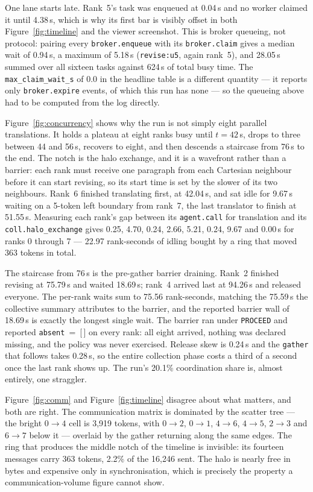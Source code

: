 \documentclass[11pt]{article}
\begin{document}
One lane starts late. Rank~5's task was enqueued at 0.04\,s and no worker claimed it until
4.38\,s, which is why its first bar is visibly offset in both Figure~\ref{fig:timeline} and the
viewer screenshot. This is broker queueing, not protocol: pairing every \texttt{broker.enqueue}
with its \texttt{broker.claim} gives a median wait of 0.94\,s, a maximum of 5.18\,s
(\texttt{revise:u5}, again rank~5), and 28.05\,s summed over all sixteen tasks against 624\,s of
total busy time. The \texttt{max\_claim\_wait\_s} of 0.0 in the headline table is a different
quantity --- it reports only \texttt{broker.expire} events, of which this run has none --- so the
queueing above had to be computed from the log directly.

Figure~\ref{fig:concurrency} shows why the run is not simply eight parallel translations. It holds
a plateau at eight ranks busy until $t = 42$\,s, drops to three between 44 and 56\,s, recovers to
eight, and then descends a staircase from 76\,s to the end. The notch is the halo exchange, and it
is a wavefront rather than a barrier: each rank must receive one paragraph from each Cartesian
neighbour before it can start revising, so its start time is set by the slower of its two
neighbours. Rank~6 finished translating first, at 42.04\,s, and sat idle for 9.67\,s waiting on a
5-token left boundary from rank~7, the last translator to finish at 51.55\,s. Measuring each
rank's gap between its \texttt{agent.call} for translation and its \texttt{coll.halo\_exchange}
gives 0.25, 4.70, 0.24, 2.66, 5.21, 0.24, 9.67 and 0.00\,s for ranks 0 through 7 --- 22.97
rank-seconds of idling bought by a ring that moved 363 tokens in total.

The staircase from 76\,s is the pre-gather barrier draining. Rank~2 finished revising at 75.79\,s
and waited 18.69\,s; rank~4 arrived last at 94.26\,s and released everyone. The per-rank waits sum
to 75.56 rank-seconds, matching the 75.59\,s the collective summary attributes to the barrier, and
the reported barrier wall of 18.69\,s is exactly the longest single wait. The barrier ran under
\texttt{PROCEED} and reported \texttt{absent}~=~[\,] on every rank: all eight arrived, nothing was
declared missing, and the policy was never exercised. Release skew is 0.24\,s and the
\texttt{gather} that follows takes 0.28\,s, so the entire collection phase costs a third of a
second once the last rank shows up. The run's 20.1\% coordination share is, almost entirely, one
straggler.

Figure~\ref{fig:comm} and Figure~\ref{fig:timeline} disagree about what matters, and both are
right. The communication matrix is dominated by the scatter tree --- the bright $0 \to 4$ cell is
3{,}919 tokens, with $0 \to 2$, $0 \to 1$, $4 \to 6$, $4 \to 5$, $2 \to 3$ and $6 \to 7$ below it
--- overlaid by the gather returning along the same edges. The ring that produces the middle notch
of the timeline is invisible: its fourteen messages carry 363 tokens, 2.2\% of the 16{,}246 sent.
The halo is nearly free in bytes and expensive only in synchronisation, which is precisely the
property a communication-volume figure cannot show.
\end{document}
